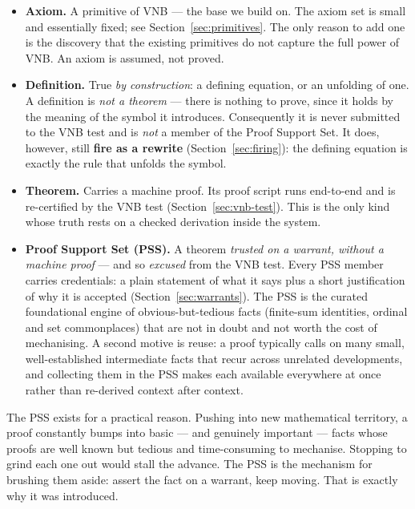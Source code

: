 \begin{itemize}
\item \textbf{Axiom.} A primitive of VNB --- the base we build on.  The
  axiom set is small and essentially fixed; see
  Section~\ref{sec:primitives}.  The only reason to add one is the
  discovery that the existing primitives do not capture the full power of
  VNB.  An axiom is assumed, not proved.

\item \textbf{Definition.} True \emph{by construction}: a defining
  equation, or an unfolding of one.  A definition is \emph{not a theorem}
  --- there is nothing to prove, since it holds by the meaning of the
  symbol it introduces.  Consequently it is never submitted to the VNB
  test and is \emph{not} a member of the Proof Support Set.  It does,
  however, still \textbf{fire as a rewrite} (Section~\ref{sec:firing}):
  the defining equation is exactly the rule that unfolds the symbol.

\item \textbf{Theorem.} Carries a machine proof.  Its proof script runs
  end-to-end and is re-certified by the VNB test
  (Section~\ref{sec:vnb-test}).  This is the only kind whose truth rests
  on a checked derivation inside the system.

\item \textbf{Proof Support Set (PSS).} A theorem \emph{trusted on a
  warrant, without a machine proof} --- and so \emph{excused} from the VNB
  test.  Every PSS member carries credentials: a plain statement of what
  it says plus a short justification of why it is accepted
  (Section~\ref{sec:warrants}).  The PSS is the curated foundational
  engine of obvious-but-tedious facts (finite-sum identities, ordinal and
  set commonplaces) that are not in doubt and not worth the cost of
  mechanising.  A second motive is reuse: a proof typically calls on many
  small, well-established intermediate facts that recur across unrelated
  developments, and collecting them in the PSS makes each available
  everywhere at once rather than re-derived context after context.
\end{itemize}

\begin{remark}
The PSS exists for a practical reason.  Pushing into new
mathematical territory, a proof constantly bumps into basic --- and
genuinely important --- facts whose proofs are well known but tedious and
time-consuming to mechanise.  Stopping to grind each one out would stall
the advance.  The PSS is the mechanism for brushing them aside: assert the
fact on a warrant, keep moving.  That is exactly why it was introduced.
\end{remark}

